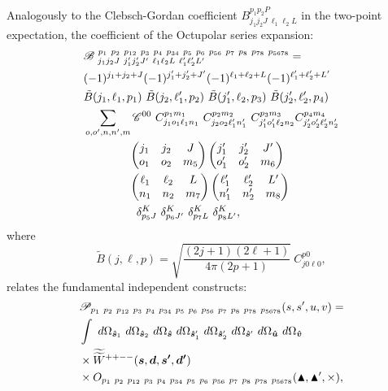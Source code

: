 \documentclass[useAMS,usenatbib]{mn2e}
\newcommand{\tj}[6]{ \begin{pmatrix}
   #1 & #2 & #3 \\
   #4 & #5 & #6 
  \end{pmatrix}}
\begin{document}
Analogously to the Clebsch-Gordan coefficient $B^{p_1 p_2 P}_{j_1 j_2 J \ \ell_1 \ell_2 L}$ in the two-point expectation, the coefficient of the Octupolar series expansion:  
\begin{align}
    &\mathcal{B}_{\ j_1 j_2 J \ j_1' j_2' J' \ \ell_1 \ell_2 L \ \ell_1' \ell_2' L'}^{\ p_1 \ p_2 \ p_{12} \ p_3 \ p_4 \ p_{34} \ p_5 \ p_6 \ p_{56} \ p_7 \ p_8 \ p_{78} \ p_{5678}} = \notag \\
    & (-1)^{j_1     + j_2     + J}
      (-1)^{j_1'    + j_2'    + J'}
      (-1)^{\ell_1  + \ell_2  + L}
      (-1)^{\ell_1' + \ell_2' + L'}
      \notag \\
     & \tilde B(j_1,  \ell_1,  p_1) \
      \tilde B(j_2,  \ell_1', p_2) \
      \tilde B(j_1', \ell_2,  p_3) \ 
      \tilde B(j_2', \ell_2', p_4) \notag \\
    & \sum_{o, o', n, n', m} \mathcal{C}^{00} \ C^{p_1 m_1}_{j_1 o_1 \ell_1 n_1} \
        C^{p_2 m_2}_{j_2 o_2 \ell_1' n_1'} \ 
        C^{p_3 m_3}_{j_1' o_1' \ell_2 n_2}
        C^{p_4 m_4}_{j_2' o_2' \ell_2' n_2'}
        \notag \\
    &  \qquad \qquad \tj{j_1}{j_2}{J}{o_1}{o_2}{m_5}
    \tj{j_1'}{j_2'}{J'}{o_1'}{o_2'}{m_6} \notag \\ 
    &  \qquad \qquad \tj{\ell_1}{\ell_2}{L}{n_1}{n_2}{m_7}
    \tj{\ell_1'}{\ell_2'}{L'}{n_1'}{n_2'}{m_8} \notag \\
    & \ \ \qquad \qquad 
    \delta^{K}_{p_5 J} \
    \delta^{K}_{p_6 J'} \
    \delta^{K}_{p_7 L} \ 
    \delta^{K}_{p_8 L'},
\end{align}
where
\begin{equation}
    \tilde B(j, \ell, p) = \sqrt{\frac{(2 j + 1)(2 \ell + 1)}{4 \pi (2p+1)}} \ C^{p0}_{j0 \ell 0}, 
\end{equation}
relates the fundamental independent constructs:
\begin{align}
&\mathcal{P}_{p_1 \ p_2 \ p_{12} \ p_3 \ p_4 \ p_{34}\ p_{5} \ p_{6} \ p_{56} \ p_{7} \ p_{8} \ p_{78} \ p_{5678}}(s, s', u, v) = \notag \\ &\int
\ d\Omega_{\boldsymbol{\hat s}_1}
\ d\Omega_{\boldsymbol{\hat s}_2}
\ d\Omega_{\boldsymbol{\hat s}}
\ d\Omega_{\boldsymbol{\hat s}_1'}
\ d\Omega_{\boldsymbol{\hat s}_2'}
\ d\Omega_{\boldsymbol{\hat s}'}
\ d\Omega_{\boldsymbol{\hat u}}
\ d\Omega_{\boldsymbol{\hat v}}
\notag \\ 
& \times 
\widetilde{\widetilde W} {}^{++--}(\boldsymbol{s}, \boldsymbol{d}, \boldsymbol{s'}, \boldsymbol{d'}) \notag \\ 
& \times O_{p_1 \ p_2 \ p_{12} \ p_3 \ p_4 \ p_{34} \ p_{5} \ p_{6} \ p_{56} \ p_{7} \ p_{8} \ p_{78} \ p_{5678}}(\blacktriangle, \blacktriangle {}', \times),
\end{align}
\end{document}

